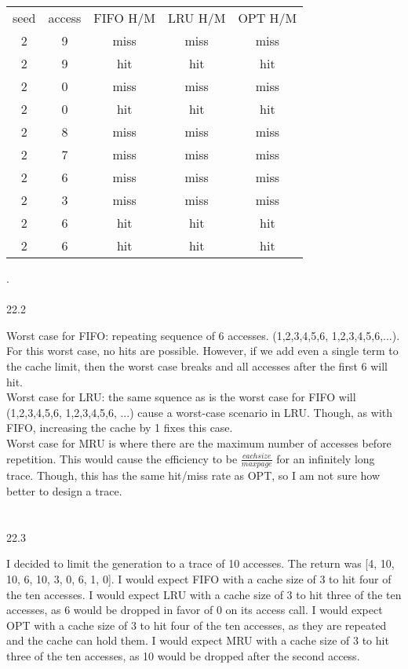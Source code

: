 \documentclass[12pt, a4paper]{article}
\begin{document}
		 \begin{center}
		\begin{tabular}{||c c c c c||}
				 seed & access & FIFO H/M & LRU H/M & OPT H/M \\ [0.5ex]  
		 2 & 9 & miss & miss & miss \\
		 2 & 9 &hit &hit & hit\\
		 2 & 0 & miss & miss & miss \\
		 2 & 0 &hit &hit & hit\\
		 2 & 8 & miss &miss & miss \\
		 2 & 7 &miss &miss & miss\\
		 2 & 6 &miss &miss & miss\\
		 2 & 3 &miss & miss & miss \\
		 2 & 6 &hit & hit& hit\\
		 2 & 6 &hit &hit & hit\\
		 \hline
		\end{tabular}
		\end{center}
		.\\ \\
	
	22.2
	
		Worst case for FIFO: repeating sequence of 6 accesses. (1,2,3,4,5,6, 1,2,3,4,5,6,...). For this worst case, no hits are possible. However, if we add even a single term to the cache limit, then the worst case breaks and all accesses after the first 6 will hit. \\
		Worst case for LRU: the same squence as  is the worst case for FIFO will (1,2,3,4,5,6, 1,2,3,4,5,6, ...) cause a worst-case scenario in LRU. Though, as with FIFO, increasing the cache by 1 fixes this case.\\
		Worst case for MRU is where there are the maximum number of accesses before repetition. This would cause the efficiency to be \( \frac{cachsize}{maxpage} \) for an infinitely long trace. Though, this has the same hit/miss rate as OPT, so I am not sure how better to design a trace. \\ \\ \\ 
		
		
	
	22.3
	
		I decided to limit the generation to a trace of 10 accesses. The return was [4, 10, 10, 6, 10, 3, 0, 6, 1, 0].
		I would expect FIFO with a cache size of 3 to hit four of the ten accesses.
		I would expect LRU with a cache size of 3 to hit three of the ten accesses, as 6 would be dropped in favor of 0 on its access call. 
		I would expect OPT with a cache size of 3 to hit four of the ten accesses, as they are repeated and the cache can hold them.
		I would expect MRU with a cache size of 3 to hit three of the ten accesses, as 10 would be dropped after the second access.\\ \\ \\
	
\end{document}
